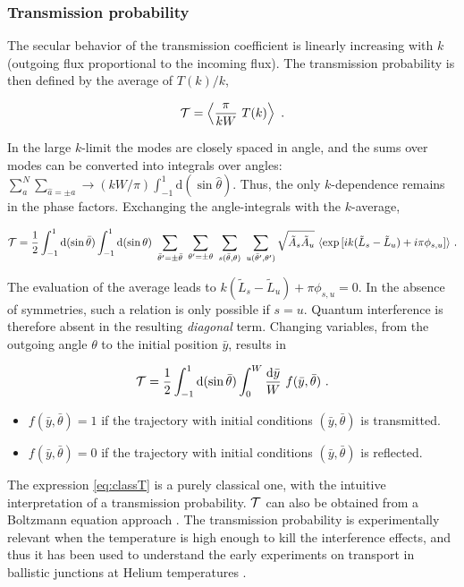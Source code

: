 \documentclass[a4paper,10pt]{article}
\newcommand{\dif}{\mathrm{d}}
\newcommand{\nin}{\noindent}
\def\btheta{\bar {\theta}}
\def\by{\bar y}
\newcommand{\be}{\begin{equation}}
\newcommand{\ee}{\end{equation}}
\begin{document}
\subsubsection{Transmission probability}

The secular behavior of the transmission coefficient is linearly increasing with $k$ (outgoing flux proportional to the incoming flux). The transmission probability is then defined by the average of $T(k)/k$, 

\be
{\cal T} = \left\langle \frac{\pi}{kW} \ T(k) \right\rangle  \ .
\label{eq:tbar0}
\ee

\nin In the large $k$-limit the modes are closely spaced in angle, and
the sums over modes can be converted into integrals over angles:
$\sum_{a}^{N} \sum_{{\hat a}=\pm a} \rightarrow (kW/\pi) 
\int_{-1}^{1} \dif(\sin{\hat {\theta}})$. Thus, the only $k$-dependence remains in the phase factors. Exchanging the angle-integrals with the $k$-average,

\be
{\cal T} = \frac{1}{2} \int_{-1}^{1} \dif(\sin{\btheta})
\int_{-1}^{1} \dif(\sin{\theta})  
\ \sum_{\btheta^{\prime}=\pm \btheta} \ \sum_{\theta^{\prime}=\pm \theta}
\ \sum_{s(\btheta,\theta)} \ \sum_{u(\btheta^{\prime},\theta^{\prime})}
\sqrt{\tilde{A}_{s} \tilde{A}_{u}} \ \langle
\exp{[i k (\tilde{L}_{s}-\tilde{L}_{u})+i \pi \phi_{s,u} ]} \rangle \ .
\label{eq:classT0}
\ee

\nin The evaluation of the average leads to 
$k (\tilde{L}_{s}\!-\!\tilde{L}_{u})+ \pi \phi_{s,u} = 0$. In the absence of symmetries, such a relation is only possible if $s\!=\!u$. Quantum interference is therefore absent in the resulting {\it diagonal} term. Changing variables, from the outgoing angle $\theta$
to the initial position $\by$, results in

\be
{\cal T} = \frac{1}{2} \int_{-1}^{1} \dif(\sin{\btheta})
\int_{0}^{W} \frac{\dif\by}{W} \ f(\by,\btheta) \ .
\label{eq:classT}
\ee

\begin{itemize}

\item $f(\by,\btheta)\!=\!1$ if the trajectory with initial conditions $(\by,\btheta)$ is transmitted.
 
\item $f(\by,\btheta)\!=\!0$ if the trajectory with initial conditions $(\by,\btheta)$ is reflected.

\end{itemize}

\nin The expression \eqref{eq:classT} is a purely classical one, with the intuitive interpretation of a transmission probability. ${\cal T}$ can also be obtained from a Boltzmann equation approach \cite{Bar91}. The transmission probability is experimentally relevant when the temperature is high enough to kill the interference effects, and thus it has been used to 
understand the early experiments on transport in ballistic junctions at
Helium temperatures \cite{Rouk,Ford89,BvH88}.
\end{document}

